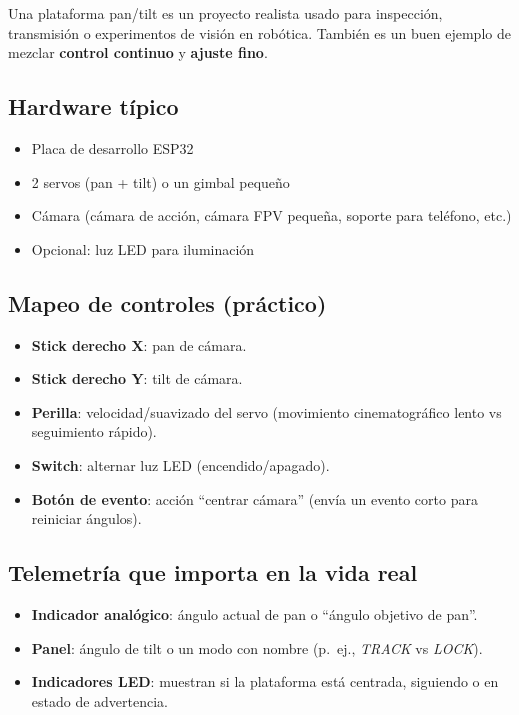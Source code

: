 Una plataforma pan/tilt es un proyecto realista usado para inspección, transmisión o experimentos de visión en robótica. También es un buen ejemplo de mezclar \textbf{control continuo} y \textbf{ajuste fino}.

\subsection*{Hardware típico}
\begin{itemize}
    \item Placa de desarrollo ESP32
    \item 2 servos (pan + tilt) o un gimbal pequeño
    \item Cámara (cámara de acción, cámara FPV pequeña, soporte para teléfono, etc.)
    \item Opcional: luz LED para iluminación
\end{itemize}

\subsection*{Mapeo de controles (práctico)}
\begin{itemize}
    \item \textbf{Stick derecho X}: pan de cámara.
    \item \textbf{Stick derecho Y}: tilt de cámara.
    \item \textbf{Perilla}: velocidad/suavizado del servo (movimiento cinematográfico lento vs seguimiento rápido).
    \item \textbf{Switch}: alternar luz LED (encendido/apagado).
    \item \textbf{Botón de evento}: acción “centrar cámara” (envía un evento corto para reiniciar ángulos).
\end{itemize}

\subsection*{Telemetría que importa en la vida real}
\begin{itemize}
    \item \textbf{Indicador analógico}: ángulo actual de pan o “ángulo objetivo de pan”.
    \item \textbf{Panel}: ángulo de tilt o un modo con nombre (p.\ ej., \textit{TRACK} vs \textit{LOCK}).
    \item \textbf{Indicadores LED}: muestran si la plataforma está centrada, siguiendo o en estado de advertencia.
\end{itemize}

